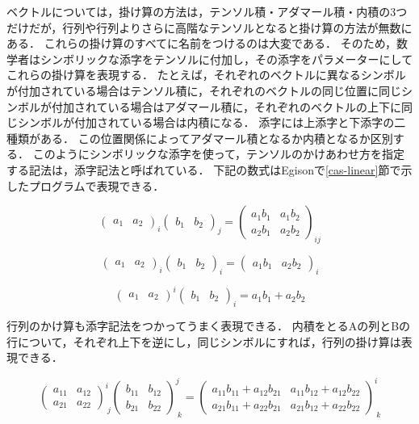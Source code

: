 ベクトルについては，掛け算の方法は，テンソル積・アダマール積・内積の3つだけだが，行列や行列よりさらに高階なテンソルとなると掛け算の方法が無数にある．
これらの掛け算のすべてに名前をつけるのは大変である．
そのため，数学者はシンボリックな添字をテンソルに付加し，その添字をパラメーターにしてこれらの掛け算を表現する．
たとえば，それぞれのベクトルに異なるシンボルが付加されている場合はテンソル積に，それぞれのベクトルの同じ位置に同じシンボルが付加されている場合はアダマール積に，それぞれのベクトルの上下に同じシンボルが付加されている場合は内積になる．
添字には上添字と下添字の二種類がある．
この位置関係によってアダマール積となるか内積となるか区別する．
このようにシンボリックな添字を使って，テンソルのかけあわせ方を指定する記法は，添字記法と呼ばれている．
下記の数式はEgisonで\ref{cas-linear}節で示したプログラムで表現できる．

$$
\begin{pmatrix}
a_{1} & a_{2}
\end{pmatrix}_{i}
\begin{pmatrix}
b_{1} & b_{2}
\end{pmatrix}_{j}
=
\begin{pmatrix}
a_{1} b_{1} & a_{1} b_{2} \\
a_{2} b_{1} & a_{2} b_{2}
\end{pmatrix}_{ij}
$$

$$
\begin{pmatrix}
a_{1} & a_{2}
\end{pmatrix}_{i}
\begin{pmatrix}
b_{1} & b_{2}
\end{pmatrix}_{i}
=
\begin{pmatrix}
a_{1} b_{1} & a_{2} b_{2}
\end{pmatrix}_{i}
$$

$$
\begin{pmatrix}
a_{1} & a_{2}
\end{pmatrix}^{i}
\begin{pmatrix}
b_{1} & b_{2}
\end{pmatrix}_{i}
=
a_{1} b_{1} + a_{2} b_{2}
$$

行列のかけ算も添字記法をつかってうまく表現できる．
内積をとるAの列とBの行について，それぞれ上下を逆にし，同じシンボルにすれば，行列の掛け算は表現できる．

$$
\begin{pmatrix}
a_{11} & a_{12} \\
a_{21} & a_{22}
\end{pmatrix}^{i}_{\ j}
\begin{pmatrix}
b_{11} & b_{12} \\
b_{21} & b_{22}
\end{pmatrix}^{j}_{\ k}
=
\begin{pmatrix}
a_{11} b_{11} + a_{12} b_{21} & a_{11} b_{12} + a_{12} b_{22} \\
a_{21} b_{11} + a_{22} b_{21} & a_{21} b_{12} + a_{22} b_{22}
\end{pmatrix}^{i}_{\ k}
$$

